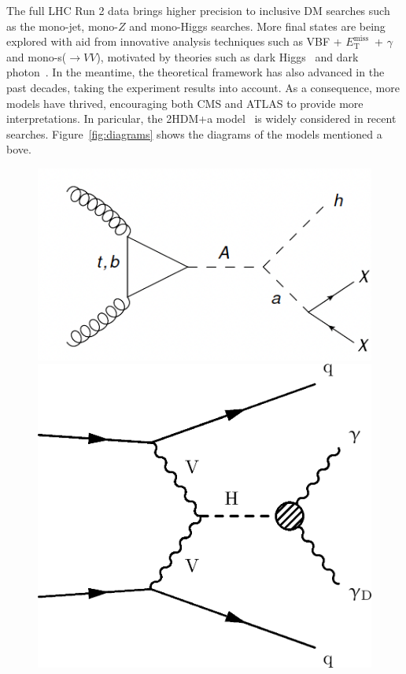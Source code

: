 \documentclass{moriond}
\def\et{E_\textrm{T}^{\textrm{miss}}}
\begin{document}
The full LHC Run 2 data brings higher
precision to inclusive DM searches such as the mono-jet, mono-$Z$ and
mono-Higgs searches. More final states are being explored with aid from
innovative analysis techniques such as VBF + $\et$\ +
$\gamma$ and mono-s($\rightarrow VV$), motivated by theories such as dark
Higgs~\cite{DarkH} and dark photon~\cite{DarkPh}. In the meantime, the
theoretical framework has also advanced in the past decades, taking the
experiment results into account. As a consequence, more models have thrived,
encouraging both CMS and ATLAS to provide more interpretations. In paricular,
the 2HDM+a model~\cite{2HDM} is widely considered in recent searches.
Figure~\ref{fig:diagrams} shows the diagrams of the models mentioned a bove.

\begin{figure} [htb]
\begin{minipage}{0.32\linewidth}
\centerline{\includegraphics[width=0.9\linewidth]{2HDM_a}}
\end{minipage}
\begin{minipage}{0.32\linewidth}
\centerline{\includegraphics[width=0.9\linewidth]{HiggsDarkPhotonDiagram}}

\end{minipage}
\end{figure}
\end{document}
